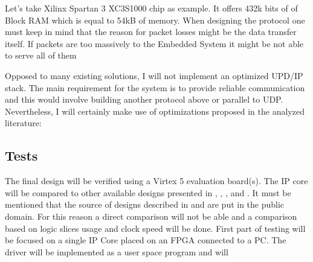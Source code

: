 \documentclass[12pt,a4paper]{article}
\begin{document}
Let's take Xilinx Spartan 3 XC3S1000 chip as example. It offers 432k bits of of Block RAM which is equal to 54kB of memory.
When designing the protocol one must keep in mind that the reason for packet losses might be the data transfer itself. If packets are too massively to the Embedded System it might be not able to serve all of them 

Opposed to many existing solutions, I will not implement an optimized UPD/IP stack. The main requirement for the system is to provide reliable communication and this would involve building another protocol above or parallel to UDP. Nevertheless, I will certainly make use of optimizations proposed in the analyzed literature: 

\subsection{Tests}
The final design will be verified using a Virtex 5 evaluation board(s). The IP core will be compared to other available designs presented in \cite{Lofgren05}, \cite{Alachiotis10}, \cite{Alachiotis11}, \cite{Herrmann09} and \cite{Zabolotny12}. It must be mentioned that the source of designs described in \cite{Herrmann09} and \cite{Lofgren05} are put in the public domain. For this reason a direct comparison will not be able and a comparison based on logic slices usage and clock speed will be done.
\mbox{}
First part of testing will be focused on a single IP Core placed on an FPGA connected to a PC. The driver will be implemented as a user space program and will 
\end{document}
